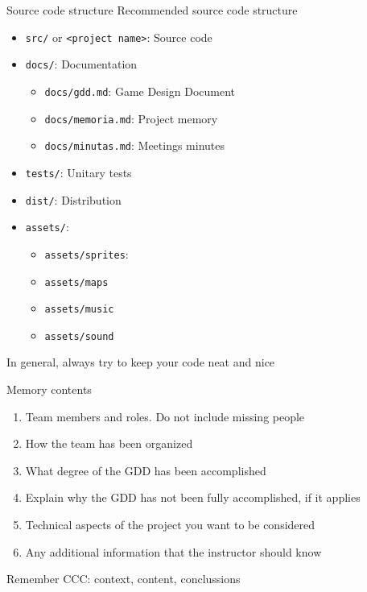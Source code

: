 \documentclass[10pt,compress]{beamer} %
\begin{document}
\begin{frame}{Source code structure}
	Recommended source code structure
	\begin{itemize}
	\item \texttt{src/} or \texttt{<project name>}: Source code
	\item \texttt{docs/}: Documentation
		\begin{itemize}
		\item \texttt{docs/gdd.md}: Game Design Document
		\item \texttt{docs/memoria.md}: Project memory
		\item \texttt{docs/minutas.md}: Meetings minutes
		\end{itemize}
	\item \texttt{tests/}: Unitary tests
	\item \texttt{dist/}: Distribution
	\item \texttt{assets/}:
		\begin{itemize}
		\item \texttt{assets/sprites}:
		\item \texttt{assets/maps}
		\item \texttt{assets/music}
		\item \texttt{assets/sound}
		\end{itemize}
	\end{itemize}
   In general, always try to keep your code neat and nice
\end{frame}

\begin{frame}{Memory contents}
	\begin{enumerate}
	\item Team members and roles. Do not include missing people
	\item How the team has been organized
	\item What degree of the GDD has been accomplished
	\item Explain why the GDD has not been fully accomplished, if it applies
    \item Technical aspects of the project you want to be considered
    \item Any additional information that the instructor should know
	\end{enumerate}
    Remember CCC: context, content, conclussions
\end{frame}
\end{document}
